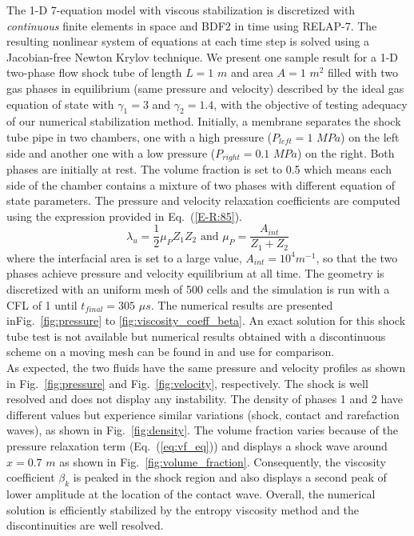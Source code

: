 \documentclass{anstrans}
\newcommand{\eqt}[1]{Eq.~(\ref{#1})}                     %
\newcommand{\fig}[1]{Fig.~\ref{#1}}                      %
\begin{document}
The 1-D 7-equation model with viscous stabilization is discretized with {\it continuous} finite elements in space and BDF2 in time using RELAP-7. The resulting nonlinear system of equations at each time step is solved using a Jacobian-free Newton Krylov technique. We present one sample result for a 1-D two-phase flow shock tube of length $L=1$ $m$ and area $A=1$ $m^2$ filled with two gas phases in equilibrium (same pressure and velocity) described by the ideal gas equation of state with $\gamma_1 = 3$ and $\gamma_2 = 1.4$, with the objective of testing adequacy of our numerical stabilization method. Initially, a membrane separates the shock tube pipe in two chambers, one with a high pressure ($P_{left} = 1$ $MPa$) on the left side and another one with a low pressure ($P_{right} = 0.1$ $MPa$) on the right. Both phases are initially at rest. The volume fraction is set to 0.5 which means each side of the chamber contains a mixture of two phases with different equation of state parameters. The pressure and velocity relaxation coefficients are computed using the expression provided in \eqt{E-R:85}. 
%
\begin{equation}\label{E-R:85}
  \lambda_u = \frac{1}{2} \mu_P Z_{1} Z_{2} \text{ and }
  \mu_P = \frac{A_{int}}{Z_{1}+Z_{2}} 
\end{equation}
%
where the interfacial area is set to a large value, $A_{int} = 10^4 m^{-1}$, so that the two phases achieve pressure and velocity equilibrium at all time. The geometry is discretized with an uniform mesh of 500 cells and the simulation is run with a CFL of 1 until $t_{final} = 305$ $\mu s$. The numerical results are presented in\fig{fig:pressure} to \ref{fig:viscosity_coeff_beta}. An exact solution for this shock tube test is not available but numerical results obtained with a discontinuous scheme on a moving mesh can be found in \cite{Saurel_2007} and use for comparison.\\

As expected, the two fluids have the same pressure and velocity profiles as shown in \fig{fig:pressure} and \fig{fig:velocity}, respectively. The shock is well resolved and does not display any instability. The density of phases 1 and 2 have different values but experience similar variations (shock, contact and rarefaction waves), as shown in \fig{fig:density}. The volume fraction varies because of the pressure relaxation term (\eqt{eq:vf_eq}) and displays a shock wave around $x=0.7$ $m$ as shown in \fig{fig:volume_fraction}. Consequently, the viscosity coefficient $\beta_k$ is peaked in the shock region and also displays a second peak of lower amplitude at the location of the contact wave. Overall, the numerical solution is efficiently stabilized by the entropy viscosity method and the discontinuities are well resolved. %
\end{document}

